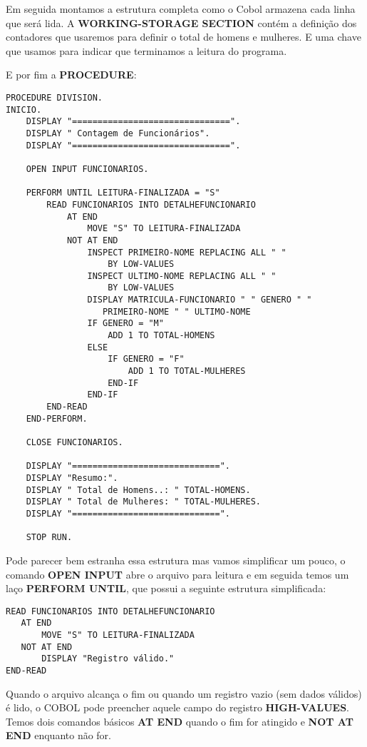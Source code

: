 Em seguida montamos a estrutura completa como o Cobol armazena cada linha que será lida. A \textbf{WORKING-STORAGE SECTION} contém a definição dos contadores que usaremos para definir o total de homens e mulheres. E uma chave que usamos para indicar que terminamos a leitura do programa.

E por fim a \textbf{PROCEDURE}:
\begin{lstlisting}[]
PROCEDURE DIVISION.
INICIO.
    DISPLAY "===============================".
    DISPLAY " Contagem de Funcionários".
    DISPLAY "===============================".

    OPEN INPUT FUNCIONARIOS.

    PERFORM UNTIL LEITURA-FINALIZADA = "S"
        READ FUNCIONARIOS INTO DETALHEFUNCIONARIO
            AT END
                MOVE "S" TO LEITURA-FINALIZADA
            NOT AT END
                INSPECT PRIMEIRO-NOME REPLACING ALL " " 
                    BY LOW-VALUES
                INSPECT ULTIMO-NOME REPLACING ALL " " 
                    BY LOW-VALUES
                DISPLAY MATRICULA-FUNCIONARIO " " GENERO " "
                   PRIMEIRO-NOME " " ULTIMO-NOME
                IF GENERO = "M"
                    ADD 1 TO TOTAL-HOMENS
                ELSE
                    IF GENERO = "F"
                        ADD 1 TO TOTAL-MULHERES
                    END-IF
                END-IF
        END-READ
    END-PERFORM. 

    CLOSE FUNCIONARIOS.

    DISPLAY "=============================".
    DISPLAY "Resumo:".
    DISPLAY " Total de Homens..: " TOTAL-HOMENS.
    DISPLAY " Total de Mulheres: " TOTAL-MULHERES.
    DISPLAY "=============================".

    STOP RUN.	
\end{lstlisting}

Pode parecer bem estranha essa estrutura mas vamos simplificar um pouco, o comando \textbf{OPEN INPUT} abre o arquivo para leitura e em seguida temos um laço \textbf{PERFORM UNTIL}, que possui a seguinte estrutura simplificada:
\begin{lstlisting}[]
READ FUNCIONARIOS INTO DETALHEFUNCIONARIO
   AT END
       MOVE "S" TO LEITURA-FINALIZADA
   NOT AT END
       DISPLAY "Registro válido."
END-READ
\end{lstlisting}

Quando o arquivo alcança o fim ou quando um registro vazio (sem dados válidos) é lido, o COBOL pode preencher aquele campo do registro \textbf{HIGH-VALUES}. Temos dois comandos básicos \textbf{AT END} quando o fim for atingido e \textbf{NOT AT END} enquanto não for.

